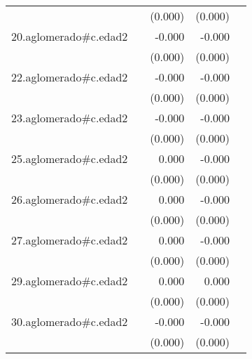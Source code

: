 {\begin{longtable}{l*{4}{D{.}{.}{-1}}}
            &                     &     (0.000)         &     (0.000)         &                     \\
\addlinespace
20.aglomerado#c.edad2&                     &      -0.000         &      -0.000         &                     \\
            &                     &     (0.000)         &     (0.000)         &                     \\
\addlinespace
22.aglomerado#c.edad2&                     &      -0.000         &      -0.000\sym{*}  &                     \\
            &                     &     (0.000)         &     (0.000)         &                     \\
\addlinespace
23.aglomerado#c.edad2&                     &      -0.000         &      -0.000\sym{**} &                     \\
            &                     &     (0.000)         &     (0.000)         &                     \\
\addlinespace
25.aglomerado#c.edad2&                     &       0.000         &      -0.000         &                     \\
            &                     &     (0.000)         &     (0.000)         &                     \\
\addlinespace
26.aglomerado#c.edad2&                     &       0.000         &      -0.000         &                     \\
            &                     &     (0.000)         &     (0.000)         &                     \\
\addlinespace
27.aglomerado#c.edad2&                     &       0.000         &      -0.000         &                     \\
            &                     &     (0.000)         &     (0.000)         &                     \\
\addlinespace
29.aglomerado#c.edad2&                     &       0.000         &       0.000         &                     \\
            &                     &     (0.000)         &     (0.000)         &                     \\
\addlinespace
30.aglomerado#c.edad2&                     &      -0.000         &      -0.000\sym{**} &                     \\
            &                     &     (0.000)         &     (0.000)         &                     \\

\end{longtable}}
